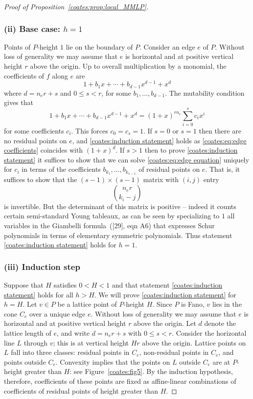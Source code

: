 \documentclass[11pt]{article}
\numberwithin{equation}{section}
\begin{document}
\begin{proof}[Proof of Proposition~\ref{coates:prop:local_MMLP}]
  \subsubsection*{(ii) Base case: $h=1$} Points of $P$-height $1$ lie on the boundary of $P$. Consider an edge $e$ of $P$. Without loss of generality we may assume that $e$ is horizontal and at positive vertical height $r$ above the origin. Up to overall multiplication by a monomial, the coefficients of $f$ along $e$ are
  \begin{equation}
    \label{coates:eq:edge coefficients}
    1 + b_1 x + \cdots + b_{d-1} x^{d-1} + x^d  
  \end{equation}
  where $d = n_e r+s$ and $0 \leq s < r$, for some $b_1,\ldots,b_{d-1}$. The mutability condition gives that 
  \begin{equation}
    \label{coates:eq:edge equation}
    1 + b_1 x + \cdots + b_{d-1} x^{d-1} + x^d = 
    (1+x)^{r n_e} \sum_{i=0}^s c_i x^i
  \end{equation}
  for some coefficients $c_i$. This forces $c_0 = c_s = 1$. If $s = 0$ or $s = 1$ then there are no residual points on $e$, and \eqref{coates:induction statement} holds as \eqref{coates:eq:edge coefficients} coincides with $(1+x)^d$. If $s>1$ then to prove \eqref{coates:induction statement} it suffices to show that we can solve \eqref{coates:eq:edge equation} uniquely for $c_i$ in terms of the coefficients $b_{k_1}, \ldots, b_{k_{s-1}}$ of residual points on $e$. That is, it suffices to show that the $(s-1) \times (s-1)$ matrix with $(i,j)$ entry
  \[
      { n_e r \choose k_i - j}
  \]
  is invertible. But the determinant of this matrix is positive -- indeed it counts certain semi-standard Young tableaux, as can be seen by specializing to $1$ all variables in the Giambelli formula~\textup{([29], eqn A6)} that expresses Schur polynomials in terms of elementary symmetric polynomials. Thus statement \eqref{coates:induction statement} holds for $h=1$. 

  \subsubsection*{(iii) Induction step} Suppose that $H$ satisfies $0 < H < 1$ and that statement \eqref{coates:induction statement} holds for all $h > H$. We will prove \eqref{coates:induction statement} for $h=H$. Let $v \in P$ be a lattice point of $P$-height $H$. Since $P$ is Fano, $v$ lies in the cone $C_e$ over a unique edge $e$. Without loss of generality we may assume that $e$ is horizontal and at positive vertical height $r$ above the origin. Let $d$ denote the lattice length of $e$, and write $d = n_e r + s$ with $0 \leq s < r$. Consider the horizontal line $L$ through $v$; this is at vertical height $Hr$ above the origin. Lattice points on $L$ fall into three classes: residual points in $C_e$, non-residual points in $C_e$, and points outside $C_e$. Convexity implies that the points on $L$ outside $C_e$ are at $P$-height greater than $H$: see Figure~\ref{coates:fig5}. By the induction hypothesis, therefore, coefficients of these points are fixed as affine-linear combinations of coefficients of residual points of height greater than $H$. 
  

\end{proof}
\end{document}

